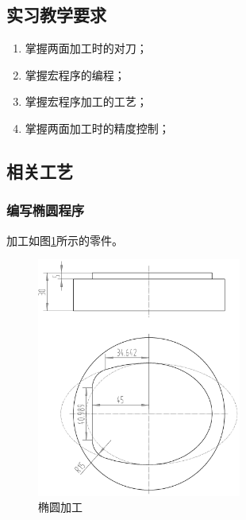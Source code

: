 \jxhj{%
	}

\makeshouye %

\subsection{实习教学要求}
\begin{enumerate}[\hspace{2em}1、]
	\item 掌握两面加工时的对刀；
	\item 掌握宏程序的编程；
	\item 掌握宏程序加工的工艺；
    \item 掌握两面加工时的精度控制；
\end{enumerate}

\subsection{相关工艺}
\subsubsection{编写椭圆程序}
加工如图\ref{椭圆加工}所示的零件。
\begin{figure}[!hbtp]
	\centering	\includegraphics[width=0.6\textwidth]{images/shixi_1-1}
	\caption{椭圆加工} \label{椭圆加工}
\end{figure}

